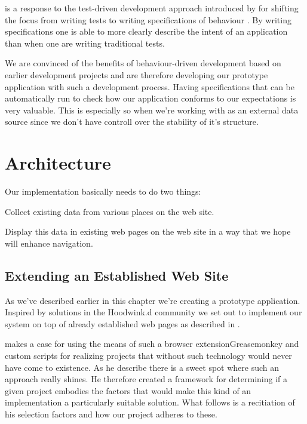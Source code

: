  is a response to the test-driven
development approach introduced by \citeauthor{north06} for shifting the focus
from writing tests to writing specifications of behaviour
\citep{north06}. By writing specifications one is able to
more clearly describe the intent of an application than when one
are writing traditional tests.

We are convinced of the benefits of behaviour-driven development based on
earlier development projects and are therefore developing our
prototype application with such a development process. Having specifications
that can be automatically run to check how our application conforms to our
expectations is very valuable. This is especially so when we're working
with \urort{} as an external data source since we don't have controll over
the stability of it's structure.

\section{Architecture}

Our implementation basically needs to do two things:

\begin{enum}
  \item Collect existing data from various places on the \urort{} web site.
  \item Display this data in existing web pages on the \urort{} web site in
    a way that we hope will enhance navigation.
\end{enum}

\subsection{Extending an Established Web Site}

As we've described earlier in this chapter we're creating a prototype
application. Inspired by solutions in the Hoodwink.d community we set
out to implement our system on top of already established web pages as
described in .

\citet{laird07} makes a case for using the means of such a browser
extension\dash{}Greasemonkey\dash{} and custom scripts for
realizing projects that without such technology would
never have come to existence. As he describe there is a sweet spot where such
an approach really shines. He therefore created a framework for determining
if a given project embodies the factors that would make this kind of an
implementation a particularly suitable solution. What follows is a recitiation
of his selection factors and how our project adheres to these.


